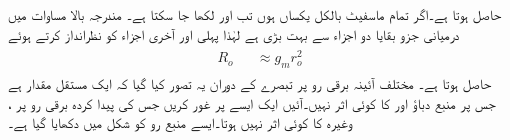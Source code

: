 حاصل ہوتا ہے۔اگر  تمام ماسفیٹ بالکل یکساں ہوں تب  اور  لکھا جا سکتا ہے۔ مندرجہ بالا مساوات میں درمیانی جزو بقایا دو اجزاء سے بہت بڑی ہے لہٰذا  پہلی اور آخری اجزاء کو نظرانداز کرتے ہوئے
\begin{gather}
\begin{aligned}
R_o & & \approx g_m r_o^2
\end{aligned} 
\end{gather}
حاصل ہوتا ہے۔
مختلف آئینہ برقی رو پر تبصرے کے دوران یہ تصور کیا گیا کہ  ایک مستقل مقدار ہے جس پر منبع دباؤ  اور  کا کوئی اثر نہیں۔آئیں ایک ایسے  پر غور کریں جس کی پیدا کردہ برقی رو پر  ،  وغیرہ کا کوئی اثر نہیں ہوتا۔ایسے  منبع رو کو شکل  میں دکھایا گیا ہے۔

